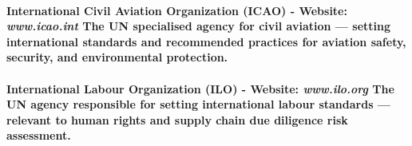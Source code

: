 \paragraph{\textbf{International Civil Aviation Organization (ICAO)} - Website: \textit{www.icao.int} The UN specialised agency for civil aviation — setting international standards and recommended practices for aviation safety, security, and environmental protection.}
\paragraph{\textbf{International Labour Organization (ILO)} - Website: \textit{www.ilo.org} The UN agency responsible for setting international labour standards — relevant to human rights and supply chain due diligence risk assessment.}
